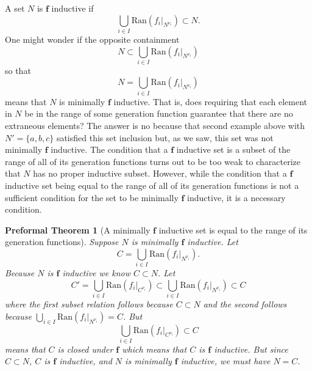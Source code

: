 \documentclass[oneside, 12pt]{book}
\theoremstyle{break}
\newtheorem{preformal definition}[definition]{Preformal Definition}
\newtheorem{preformal theorem}[theorem]{Preformal Theorem}
\newcommand{\bv}[1]{\boldsymbol{#1}}
\begin{document}
				A set $N$ is $\bv{f}$ inductive if
				\begin{equation*}
					\bigcup_{i\in I} \text{Ran}(f_i|_{N^{\nu_i}}) \subset N.
				\end{equation*}
				One might wonder if the opposite containment
				\begin{equation*}
					N \subset \bigcup_{i\in I} \text{Ran}(f_i|_{N^{\nu_i}})
				\end{equation*}
				so that
				\begin{equation*}
					N = \bigcup_{i\in I} \text{Ran}(f_i|_{N^{\nu_i}})
				\end{equation*}
				means that $N$ is minimally $\bv{f}$ inductive.
				That is, does requiring that each element in $N$ be in the range of some generation function guarantee that there are no extraneous elements?
				The answer is no because that second example above with $N' = \{a, b, c\}$ satisfied this set inclusion but, as we saw, this set was not minimally $\bv{f}$ inductive.
				The condition that a $\bv{f}$ inductive set is a subset of the range of all of its generation functions turns out to be too weak to characterize that $N$ has no proper inductive subset.
				However, while the condition that a $\bv{f}$ inductive set being equal to the range of all of its generation functions is not a sufficient condition for the set to be minimally $\bv{f}$ inductive, it is a necessary condition.
				
				\begin{preformal theorem}[A minimally $\bv{f}$ inductive set is equal to the range of its generation functions]
					\label{thm:minimally inductive set is union of the ranges of generation functions}
					Suppose $N$ is minimally $\bv{f}$ inductive.
					Let
					\begin{equation*}
						C = \bigcup_{i\in I} \text{Ran}(f_i|_{N^{\nu_i}}).
					\end{equation*}
					Because $N$ is $\bv{f}$ inductive we know $C \subset N$.
					Let
					\begin{equation*}
						C' = \bigcup_{i\in I} \text{Ran}(f_i|_{C^{\nu_i}}) \subset \bigcup_{i\in I} \text{Ran}(f_i|_{N^{\nu_i}}) \subset C
					\end{equation*}
					where the first subset relation follows because $C\subset N$ and the second follows because $\bigcup_{i\in I}\text{Ran}(f_i|_{N^{\nu_i}}) = C$.
					But 
					\begin{equation*}
						\bigcup_{i\in I} \text{Ran}(f_i|_{C^{\nu_i}}) \subset C
					\end{equation*}
					means that $C$ is closed under $\bv{f}$ which means that $C$ is $\bv{f}$ inductive.
					But since $C\subset N$, $C$ is $\bv{f}$ inductive, and $N$ is minimally $\bv{f}$ inductive, we must have $N=C$.
				\end{preformal theorem}
				
\end{document}

